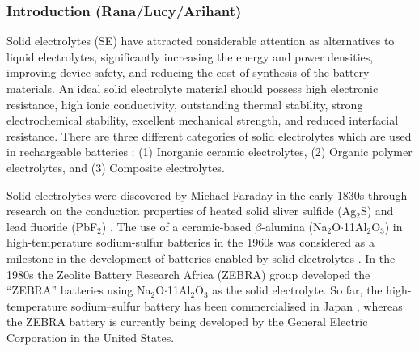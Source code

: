 \documentclass[../main.tex]{subfiles}
\begin{document}
\subsubsection{Introduction (Rana/Lucy/Arihant)}

Solid electrolytes (SE) have attracted considerable attention as alternatives to liquid electrolytes, significantly increasing the energy and power densities, improving device safety, and reducing the cost of synthesis of the battery materials. \cite{janek_solid_2016, culver_designing_2018, famprikis_fundamentals_2019, goodenough_li-ion_2013, DIRICAN201927} 
An ideal solid electrolyte material should possess  high electronic resistance, high ionic conductivity, outstanding thermal stability, strong electrochemical stability, excellent mechanical strength, and reduced interfacial resistance. \cite{han2020recent, manthiram2017} There are three different categories of solid electrolytes which are used in rechargeable batteries \cite{DIRICAN201927}: (1) Inorganic ceramic electrolytes, (2) Organic polymer electrolytes, and (3) Composite electrolytes. 

Solid electrolytes were discovered by Michael Faraday in the early 1830s through research on the conduction properties of heated solid sliver sulfide (Ag$_{2}$S) and lead fluoride (PbF$_{2}$) \cite{Faraday1833}. 
The use of a ceramic-based $\beta$-alumina (Na$_{2}$O$\cdot$11Al$_{2}$O$_{3}$) in high-temperature sodium-sulfur batteries in the 1960s was considered as a milestone in the development of batteries enabled by solid electrolytes \cite{armand2008building}. In the 1980s the Zeolite Battery Research Africa (ZEBRA) group developed the ``ZEBRA'' batteries using Na$_{2}$O$\cdot$11Al$_{2}$O$_{3}$ as the solid electrolyte. \cite{ZEBRA}
So far, the high-temperature sodium–sulfur battery has been commercialised in Japan \cite{oshima2004}, whereas the ZEBRA battery is currently being developed by the General Electric Corporation in the United States. \cite{capasso2014} 
\end{document}
